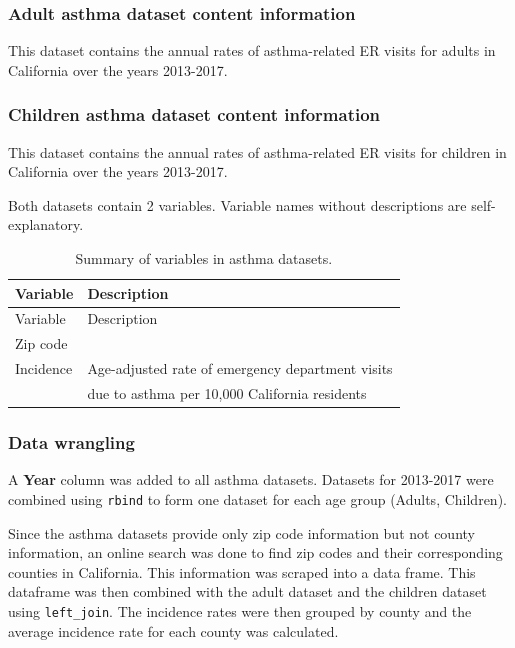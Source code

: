 \documentclass[12pt,]{article}
\begin{document}
\hypertarget{adult-asthma-dataset-content-information}{%
\subsubsection{Adult asthma dataset content
information}\label{adult-asthma-dataset-content-information}}

This dataset contains the annual rates of asthma-related ER visits for
adults in California over the years 2013-2017.

\hypertarget{children-asthma-dataset-content-information}{%
\subsubsection{Children asthma dataset content
information}\label{children-asthma-dataset-content-information}}

This dataset contains the annual rates of asthma-related ER visits for
children in California over the years 2013-2017.

Both datasets contain 2 variables. Variable names without descriptions
are self-explanatory.

\begin{longtable}[]{@{}ll@{}}
\caption{Summary of variables in asthma datasets.}\tabularnewline
\toprule
Variable & Description\tabularnewline
\midrule
\endfirsthead
\toprule
Variable & Description\tabularnewline
\midrule
\endhead
Zip code &\tabularnewline
Incidence & Age-adjusted rate of emergency department
visits\tabularnewline
& due to asthma per 10,000 California residents\tabularnewline
\bottomrule
\end{longtable}

\hypertarget{data-wrangling-1}{%
\subsubsection{Data wrangling}\label{data-wrangling-1}}

A \textbf{Year} column was added to all asthma datasets. Datasets for
2013-2017 were combined using \texttt{rbind} to form one dataset for
each age group (Adults, Children).

Since the asthma datasets provide only zip code information but not
county information, an online search was done to find zip codes and
their corresponding counties in California. This information was scraped
into a data frame. This dataframe was then combined with the adult
dataset and the children dataset using \texttt{left\_join}. The
incidence rates were then grouped by county and the average incidence
rate for each county was calculated.
\end{document}
